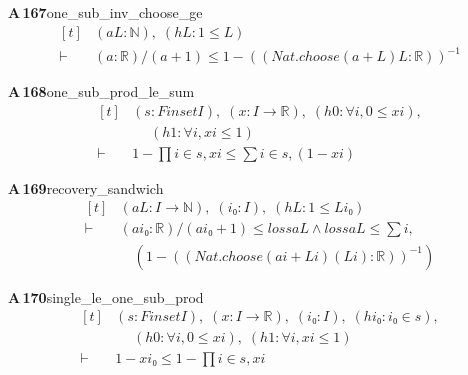 \documentclass[conference]{IEEEtran}
\theoremstyle{definition}
\newcommand{\lean}[1]{\textsf{\footnotesize #1}}
\begin{document}
\noindent\textbf{A\,167}\quad\lean{one\_sub\_inv\_choose\_ge}
{\footnotesize\[ \begin{aligned}[t]
&(\mathit{a} \mathit{L} : \mathbb{N} ),\; (\mathit{hL} : 1 \leq \mathit{L})\\
\vdash\;&(\mathit{a} : \mathbb{R} ) / (\mathit{a} + 1) \leq 1 - ((\mathit{Nat}.\mathit{choose} (\mathit{a} + \mathit{L}) \mathit{L} : \mathbb{R} ))^{-1}
\end{aligned} \]}

\noindent\textbf{A\,168}\quad\lean{one\_sub\_prod\_le\_sum}
{\footnotesize\[ \begin{aligned}[t]
&(\mathit{s} : \mathit{Finset} \mathit{I}),\; (\mathit{x} : \mathit{I} \to \mathbb{R} ),\; (\mathit{h0} : \forall \mathit{i}, 0 \leq \mathit{x} \mathit{i}),\\
&\quad \; (\mathit{h1} : \forall \mathit{i}, \mathit{x} \mathit{i} \leq 1)\\
\vdash\;&1 - \textstyle\prod \mathit{i} \in \mathit{s}, \mathit{x} \mathit{i} \leq \textstyle\sum \mathit{i} \in \mathit{s}, (1 - \mathit{x} \mathit{i})
\end{aligned} \]}

\noindent\textbf{A\,169}\quad\lean{recovery\_sandwich}
{\footnotesize\[ \begin{aligned}[t]
&(\mathit{a} \mathit{L} : \mathit{I} \to \mathbb{N} ),\; (\mathit{i₀} : \mathit{I}),\; (\mathit{hL} : 1 \leq \mathit{L} \mathit{i₀})\\
\vdash\;&(\mathit{a} \mathit{i₀} : \mathbb{R} ) / (\mathit{a} \mathit{i₀} + 1) \leq \mathit{loss} \mathit{a} \mathit{L} \wedge \mathit{loss} \mathit{a} \mathit{L} \leq \textstyle\sum \mathit{i},\\
&\quad (1 - ((\mathit{Nat}.\mathit{choose} (\mathit{a} \mathit{i} + \mathit{L} \mathit{i}) (\mathit{L} \mathit{i}) : \mathbb{R} ))^{-1} )
\end{aligned} \]}

\noindent\textbf{A\,170}\quad\lean{single\_le\_one\_sub\_prod}
{\footnotesize\[ \begin{aligned}[t]
&(\mathit{s} : \mathit{Finset} \mathit{I}),\; (\mathit{x} : \mathit{I} \to \mathbb{R} ),\; (\mathit{i₀} : \mathit{I}),\; (\mathit{hi₀} : \mathit{i₀} \in \mathit{s}),\\
&\quad \; (\mathit{h0} : \forall \mathit{i}, 0 \leq \mathit{x} \mathit{i}),\; (\mathit{h1} : \forall \mathit{i}, \mathit{x} \mathit{i} \leq 1)\\
\vdash\;&1 - \mathit{x} \mathit{i₀} \leq 1 - \textstyle\prod \mathit{i} \in \mathit{s}, \mathit{x} \mathit{i}
\end{aligned} \]}
\end{document}
